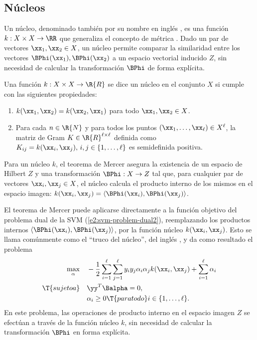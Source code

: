 %
%
\subsection{Núcleos}
%
Un núcleo, denominado también por su nombre en inglés , es
una función $k:X\times{}X\rightarrow{}\RR$ que generaliza el concepto
de métrica \cite{stewart}.
Dado un par de vectores $\xx_1,\xx_2\in{}X$, un núcleo permite
comparar la similaridad entre los vectores $\BPhi(\xx_1),\BPhi(\xx_2)$
 a un espacio vectorial inducido $Z$, sin necesidad
de calcular la transformación $\BPhi$ de forma explícita.
%
\begin{definicion}[Núcleo]
  Una función $k:X\times{}X\rightarrow{}\R{R}$ se dice un núcleo
  en el conjunto $X$ si cumple con las siguientes propiedades:
  \begin{enumerate}
  \item $k(\xx_1,\xx_2)=k(\xx_2,\xx_1)$ para todo $\xx_1,\xx_2\in{}X$.
  \item Para cada $n\in\R{N}$ y para todos los puntos
    $(\xx_1,\ldots,\xx_\ell)\in{}X^\ell$, la matriz de Gram
    $K\in\R{R}^{\ell\times\ell}$ definida como
    $K_{ij}=k(\xx_i,\xx_j),\,i,j\in\{1,\ldots,\ell\}$ es semidefinida
    positiva.
  \end{enumerate}
\end{definicion}
%
Para un núcleo $k$, el teorema de Mercer \cite{mercer} asegura la
existencia de un espacio de Hilbert $Z$ y una transformación
$\BPhi:X\rightarrow{}Z$ tal que, para cualquier par de vectores
$\xx_i,\xx_j\in{}X$, el núcleo calcula el producto interno de los
mismos en el espacio imagen:
$k(\xx_i,\xx_j)=\langle\BPhi(\xx_i),\BPhi(\xx_j)\rangle$.

El teorema de Mercer puede aplicarse directamente a la función
objetivo del problema dual de la SVM (\ref{e2:svm-problem-dual2}),
reemplazando los productos internos
$\left\langle\BPhi(\xx_i),\BPhi(\xx_j)\right\rangle$, por la función
núcleo $k(\xx_i,\xx_j)$.
Esto se llama comúnmente como el ``truco del núcleo'', del inglés
, y da como resultado el problema
%
\begin{align}
  \begin{split}
    \max_\alpha &\quad
    -\frac{1}{2}\sum_{i=1}^\ell\sum_{j=1}^\ell y_iy_j\alpha_i\alpha_j
    k(\xx_i,\xx_j) + \sum_{i=1}^{\ell} \alpha_i \\
    \T{sujeto a} &\quad \yy^T\Balpha = 0, \\
    &\quad \alpha_i \geq 0\T{ para todo } i\in\{1,\ldots,\ell\}.
  \end{split}
  \label{e2:svm-problem-kernel}
\end{align}
%
En este problema, las operaciones de producto interno en el espacio
imagen $Z$ se efectúan a través de la función núcleo $k$, sin
necesidad de calcular la transformación $\BPhi$ en forma explícita.

